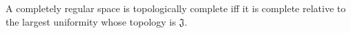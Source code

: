A completely regular space is topologically complete iff it is complete relative to the largest uniformity whose topology is $\mathfrak{J}$.
